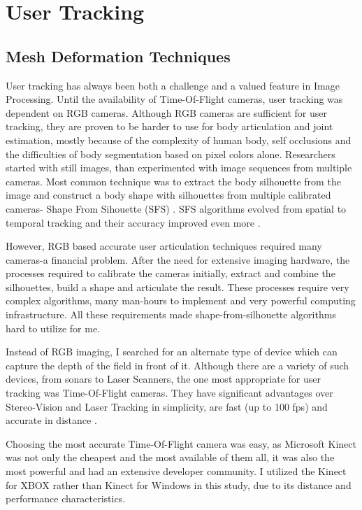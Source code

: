 \chapter{User Tracking}
\label{chapter2}

\section{Mesh Deformation Techniques}

User tracking has always been both a challenge and a valued feature in Image Processing. Until the availability of Time-Of-Flight cameras, user tracking was dependent on RGB cameras. Although RGB cameras are sufficient for user tracking, they are proven to be harder to use for body articulation and joint estimation, mostly because of the complexity of human body, self occlusions and the difficulties of body segmentation based on pixel colors alone. Researchers started with still images, than experimented with image sequences from multiple cameras. Most common technique was to extract the body silhouette from the image and construct a body shape with silhouettes from multiple calibrated cameras- Shape From Sihouette (SFS) \cite{Cheung2005}. SFS algorithms evolved from spatial to temporal tracking and their accuracy improved even more \cite{Cheung2005}. 

However, RGB based accurate user articulation techniques required many cameras-a financial problem. After the need for extensive imaging hardware, the processes required to calibrate the cameras initially, extract and combine the silhouettes, build a shape and articulate the result. These processes require very complex algorithms, many man-hours to implement and very powerful computing infrastructure. All these requirements made shape-from-silhouette algorithms hard to utilize for me.

Instead of RGB imaging, I searched for an alternate type of device which can capture the depth of the field in front of it. Although there are a variety of such devices, from sonars to Laser Scanners, the one most appropriate for user tracking was Time-Of-Flight cameras. They have significant advantages over Stereo-Vision and Laser Tracking in simplicity, are fast (up to 100 fps) and accurate in distance \cite{Kourosh2012}.

Choosing the most accurate Time-Of-Flight camera was easy, as Microsoft Kinect was not only the cheapest and the most available of them all, it was also the most powerful and had an extensive developer community. I utilized the Kinect for XBOX rather than Kinect for Windows in this study, due to its distance and performance characteristics.

